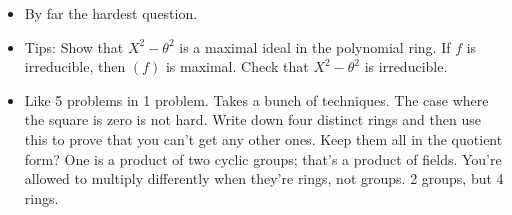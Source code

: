 \documentclass[../notes.tex]{subfiles}
\begin{document}
\begin{itemize}
    \begin{itemize}
        \item By far the hardest question.
        \item Tips: Show that $X^2-\theta^2$ is a maximal ideal in the polynomial ring. If $f$ is irreducible, then $(f)$ is maximal. Check that $X^2-\theta^2$ is irreducible.
        \item Like 5 problems in 1 problem. Takes a bunch of techniques. The case where the square is zero is not hard. Write down four distinct rings and then use this to prove that you can't get any other ones. Keep them all in the quotient form? One is a product of two cyclic groups; that's a product of fields. You're allowed to multiply differently when they're rings, not groups. 2 groups, but 4 rings.
    \end{itemize}
\end{itemize}
\end{document}
